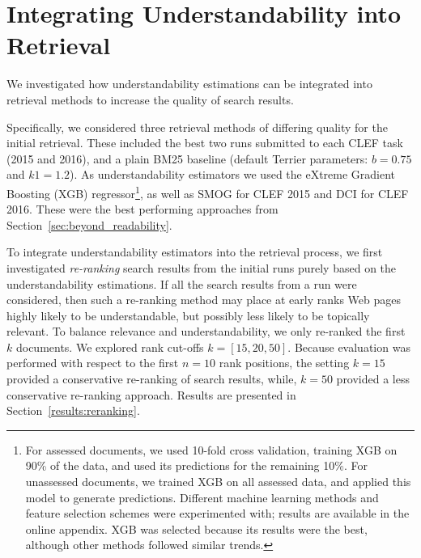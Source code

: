 \section{Integrating Understandability into Retrieval}
\label{sec:experiments}


We investigated how understandability estimations can be integrated into retrieval methods to increase the quality of search results. %

Specifically, we considered three retrieval methods of differing quality for the initial retrieval. These included the best two runs submitted to each CLEF task (2015 and 2016), and a plain BM25 baseline (default Terrier parameters: $b=0.75$ and $k1=1.2$). As understandability estimators we used the eXtreme Gradient Boosting (XGB) regressor\footnote{For assessed documents, we used 10-fold cross validation, training XGB on 90\% of the data, and used its predictions for the remaining 10\%. For unassessed documents, we trained XGB on all assessed data, and applied this model to generate predictions. Different machine learning methods and feature selection schemes were experimented with; results are available in the online appendix. XGB was selected because its results were the best, although other methods followed similar trends.}\cite{chen16}, as well as SMOG for CLEF 2015 and DCI for CLEF 2016. These were the best performing approaches from Section~\ref{sec:beyond_readability}.

To integrate understandability estimators into the retrieval process, we first investigated \textit{re-ranking} search results from the initial runs purely based on the understandability estimations. 
If all the search results from a run were considered, then such a re-ranking method may place at early ranks Web pages highly likely to be understandable, but possibly less likely to be topically relevant. To balance relevance and understandability, we only re-ranked the first $k$ documents. We explored rank cut-offs $k = [15, 20, 50]$. Because evaluation was performed with respect to the first $n=10$ rank positions, the setting $k=15$ provided a conservative re-ranking of search results, while, $k=50$ provided a less conservative re-ranking approach. Results are presented in Section~\ref{results:reranking}.

